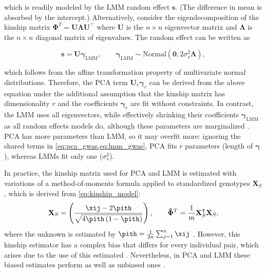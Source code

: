\documentclass[11pt]{article}
\begin{document}
\begin{linenumbers}
which is readily modeled by the LMM random effect $\mathbf{s}$.
(The difference in mean is absorbed by the intercept.)
Alternatively, consider the eigendecomposition of the kinship matrix $\mathbf{\Phi}^T = \mathbf{U} \mathbf{\Lambda} \mathbf{U}^\intercal$ where $\mathbf{U}$ is the $n \times n$ eigenvector matrix and $\mathbf{\Lambda}$ is the $n \times n$ diagonal matrix of eigenvalues.
The random effect can be written as
\begin{linenomath*}
$$
\mathbf{s} = \mathbf{U} \boldsymbol{\gamma}_\text{LMM},
\quad\quad
\boldsymbol{\gamma}_\text{LMM}
\sim \text{Normal}( \mathbf{0}, 2 \sigma_s^2 \boldsymbol{\Lambda})
,
$$
\end{linenomath*}
which follows from the affine transformation property of multivariate normal distributions.
Therefore, the PCA term $\mathbf{U}_r \boldsymbol{\gamma}_r$ can be derived from the above equation under the additional assumption that the kinship matrix has dimensionality $r$ and the coefficients $\boldsymbol{\gamma}_r$ are fit without constraints.
In contrast, the LMM uses all eigenvectors, while effectively shrinking their coefficients $\boldsymbol{\gamma}_\text{LMM}$ as all random effects models do, although these parameters are marginalized \citep{astle_population_2009, hoffman_correcting_2013, zhang_principal_2015}.
PCA has more parameters than LMM, so it may overfit more: ignoring the shared terms in \cref{eq:pca_gwas,eq:lmm_gwas}, PCA fits $r$ parameters (length of $\boldsymbol{\gamma}$), whereas LMMs fit only one ($\sigma^2_s$).

In practice, the kinship matrix used for PCA and LMM is estimated with variations of a method-of-moments formula applied to standardized genotypes $\mathbf{X}_S$, which is derived from \cref{eq:kinship_model}:
\begin{equation}
  \label{eq:kinship_std}
  \mathbf{X}_S
  =
  \left(
    \frac{
      \xij - 2 \pith
    }{
      \sqrt{4 \pith \left( 1 - \pith \right)}
    }
  \right)
  ,
  \quad\quad
  \mathbf{\hat{\Phi}}^T
  =
  \frac{1}{m}
  \mathbf{X}_S^\intercal
  \mathbf{X}_S
  ,
\end{equation}
where the unknown \pit is estimated by
$
\pith = \frac{1}{2n} \sum_{j = 1}^n \xij
$
\citep{price_principal_2006, kang_efficient_2008, kang_variance_2010, yang_gcta:_2011, zhou_genome-wide_2012, yang_advantages_2014, loh_efficient_2015, sul_population_2018, zhou_efficiently_2018}.
However, this kinship estimator has a complex bias that differs for every individual pair, which arises due to the use of this estimated \pith \citep{ochoa_estimating_2021, ochoa_new_2019}.
Nevertheless, in PCA and LMM these biased estimates perform as well as unbiased ones \citep{hou_genetic_2023}.


\end{linenumbers}
\end{document}
